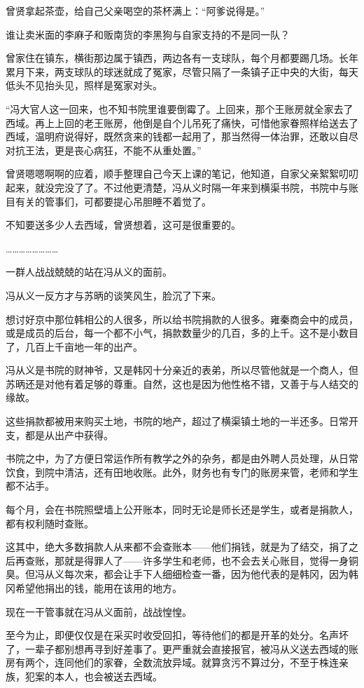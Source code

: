 曾贤拿起茶壶，给自己父亲喝空的茶杯满上：“阿爹说得是。”

谁让卖米面的李麻子和贩南货的李黑狗与自家支持的不是同一队？

曾家住在镇东，横街那边属于镇西，两边各有一支球队，每个月都要踢几场。长年累月下来，两支球队的球迷就成了冤家，尽管只隔了一条镇子正中央的大街，每天低头不见抬头见，照样是冤家对头。

“冯大官人这一回来，也不知书院里谁要倒霉了。上回来，那个王账房就全家去了西域。再上上回的老王账房，他倒是自个儿吊死了痛快，可惜他家眷照样给送去了西域，温明府说得好，既然贪来的钱都一起用了，那当然得一体治罪，还敢以自尽对抗王法，更是丧心病狂，不能不从重处置。”

曾贤嗯嗯啊啊的应着，顺手整理自己今天上课的笔记，他知道，自家父亲絮絮叨叨起来，就没完没了了。不过他更清楚，冯从义时隔一年来到横渠书院，书院中与账目有关的管事们，可都要提心吊胆睡不着觉了。

不知要送多少人去西域，曾贤想着，这可是很重要的。

……………………

一群人战战兢兢的站在冯从义的面前。

冯从义一反方才与苏昞的谈笑风生，脸沉了下来。

想讨好京中那位韩相公的人很多，所以给书院捐款的人很多。雍秦商会中的成员，或是成员的后台，每一个都不小气，捐款数量少的几百，多的上千。这不是小数目了，几百上千亩地一年的出产。

冯从义是书院的财神爷，又是韩冈十分亲近的表弟，所以尽管他就是一个商人，但苏昞还是对他有着足够的尊重。自然，这也是因为他性格不错，又善于与人结交的缘故。

这些捐款都被用来购买土地，书院的地产，超过了横渠镇土地的一半还多。日常开支，都是从出产中获得。

书院之中，为了方便日常运作所有教学之外的杂务，都是由外聘人员处理，从日常饮食，到院中清洁，还有田地收账。此外，财务也有专门的账房来管，老师和学生都不沾手。

每个月，会在书院照壁墙上公开账本，同时无论是师长还是学生，或者是捐款人，都有权利随时查账。

这其中，绝大多数捐款人从来都不会查账本——他们捐钱，就是为了结交，捐了之后再查账，那就是得罪人了——许多学生和老师，也不会去关心账目，觉得一身铜臭。但冯从义每次来，都会让手下人细细检查一番，因为他代表的是韩冈，因为韩冈希望他捐出的钱，能用在该用的地方。

现在一干管事就在冯从义面前，战战惶惶。

至今为止，即便仅仅是在采买时收受回扣，等待他们的都是开革的处分。名声坏了，一辈子都别想再寻到好差事了。更严重就会直接报官，被冯从义送去西域的账房有两个，连同他们的家眷，全数流放异域。就算贪污不算过分，不至于株连亲族，犯案的本人，也会被送去西域。

